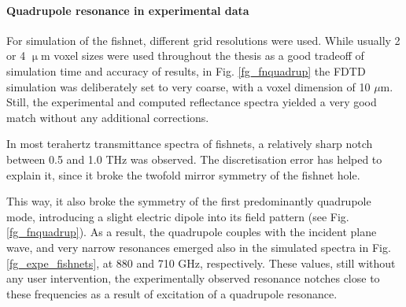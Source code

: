 {\paragraph{Quadrupole resonance in experimental data}%
For simulation of the fishnet, different grid resolutions were used. While usually 2 or 4 $\upmu$m voxel sizes were used throughout the thesis as a good tradeoff of simulation time and accuracy of results, in Fig.  \ref{fg_fnquadrup} the FDTD simulation was deliberately set to very coarse, with a voxel dimension of 10 $\mu$m. Still, the experimental and computed reflectance spectra yielded a very good match without any additional corrections.

In most terahertz transmittance spectra of fishnets, a relatively sharp notch between 0.5 and 1.0 THz was observed. The discretisation error has helped to explain it, since it broke the twofold mirror symmetry of the fishnet hole. 

This way, it also broke the symmetry of the first predominantly quadrupole mode, introducing a slight electric dipole into its field pattern  (see Fig. \ref{fg_fnquadrup}). As a result, the quadrupole couples with the incident plane wave, and very narrow resonances emerged also in the simulated spectra in Fig. \ref{fg_expe_fishnets}, at 880 and 710 GHz, respectively. These values, still without any user intervention, the experimentally observed resonance notches close to these frequencies as a result of excitation of a quadrupole resonance.   %




 
}
